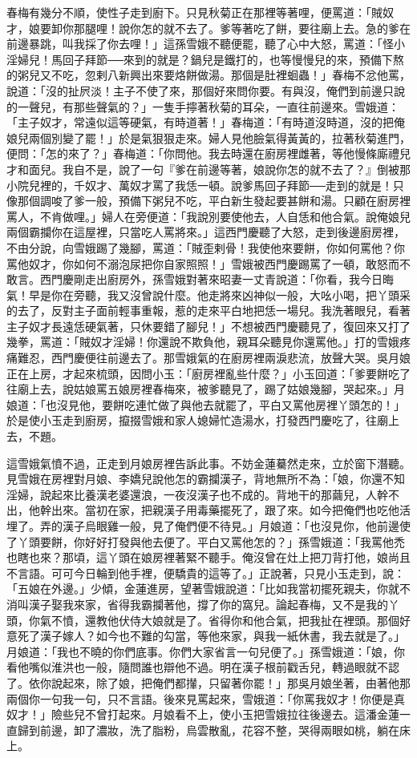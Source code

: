 \begin{showcontents}{}
春梅有幾分不順，使性子走到廚下。只見秋菊正在那裡等著哩，便罵道：「賊奴才，娘要卸你那腿哩！說你怎的就不去了。爹等著吃了餅，要往廟上去。急的爹在前邊暴跳，叫我採了你去哩！」這孫雪娥不聽便罷，聽了心中大怒，罵道：「怪小淫婦兒！馬回子拜節──來到的就是？鍋兒是鐵打的，也等慢慢兒的來，預備下熬的粥兒又不吃，忽剌八新興出來要烙餅做湯。那個是肚裡蛔蟲！」春梅不忿他罵，說道：「沒的扯屄淡！主子不使了來，那個好來問你要。有與沒，俺們到前邊只說的一聲兒，有那些聲氣的？」一隻手擰著秋菊的耳朵，一直往前邊來。雪娥道：「主子奴才，常遠似這等硬氣，有時道著！」春梅道：「有時道沒時道，沒的把俺娘兒兩個別變了罷！」於是氣狠狠走來。婦人見他臉氣得黃黃的，拉著秋菊進門，便問：「怎的來了？」春梅道：「你問他。我去時還在廚房裡雌著，等他慢條廝禮兒才和面兒。我自不是，說了一句『爹在前邊等著，娘說你怎的就不去了？』倒被那小院兒裡的，千奴才、萬奴才罵了我恁一頓。說爹馬回子拜節──走到的就是！只像那個調唆了爹一般，預備下粥兒不吃，平白新生發起要甚餅和湯。只顧在廚房裡罵人，不肯做哩。」婦人在旁便道：「我說別要使他去，人自恁和他合氣。說俺娘兒兩個霸攔你在這屋裡，只當吃人罵將來。」這西門慶聽了大怒，走到後邊廚房裡，不由分說，向雪娥踢了幾腳，罵道：「賊歪剌骨！我使他來要餅，你如何罵他？你罵他奴才，你如何不溺泡尿把你自家照照！」雪娥被西門慶踢罵了一頓，敢怒而不敢言。西門慶剛走出廚房外，孫雪娥對著來昭妻一丈青說道：「你看，我今日晦氣！早是你在旁聽，我又沒曾說什麼。他走將來凶神似一般，大吆小喝，把丫頭采的去了，反對主子面前輕事重報，惹的走來平白地把恁一場兒。我洗著眼兒，看著主子奴才長遠恁硬氣著，只休要錯了腳兒！」不想被西門慶聽見了，復回來又打了幾拳，罵道：「賊奴才淫婦！你還說不欺負他，親耳朵聽見你還罵他。」打的雪娥疼痛難忍，西門慶便往前邊去了。那雪娥氣的在廚房裡兩淚悲流，放聲大哭。吳月娘正在上房，才起來梳頭，因問小玉：「廚房裡亂些什麼？」小玉回道：「爹要餅吃了往廟上去，說姑娘罵五娘房裡春梅來，被爹聽見了，踢了姑娘幾腳，哭起來。」月娘道：「也沒見他，要餅吃連忙做了與他去就罷了，平白又罵他房裡丫頭怎的！」於是使小玉走到廚房，攛掇雪娥和家人媳婦忙造湯水，打發西門慶吃了，往廟上去，不題。

這雪娥氣憤不過，正走到月娘房裡告訴此事。不妨金蓮驀然走來，立於窗下潛聽。見雪娥在房裡對月娘、李嬌兒說他怎的霸攔漢子，背地無所不為：「娘，你還不知淫婦，說起來比養漢老婆還浪，一夜沒漢子也不成的。背地干的那繭兒，人幹不出，他幹出來。當初在家，把親漢子用毒藥擺死了，跟了來。如今把俺們也吃他活埋了。弄的漢子烏眼雞一般，見了俺們便不待見。」月娘道：「也沒見你，他前邊使了丫頭要餅，你好好打發與他去便了。平白又罵他怎的？」孫雪娥道：「我罵他禿也瞎也來？那頃，這丫頭在娘房裡著緊不聽手。俺沒曾在灶上把刀背打他，娘尚且不言語。可可今日輪到他手裡，便驕貴的這等了。」正說著，只見小玉走到，說： 「五娘在外邊。」少傾，金蓮進房，望著雪娥說道：「比如我當初擺死親夫，你就不消叫漢子娶我來家，省得我霸攔著他，撐了你的窩兒。論起春梅，又不是我的丫頭，你氣不憤，還教他伏侍大娘就是了。省得你和他合氣，把我扯在裡頭。那個好意死了漢子嫁人？如今也不難的勾當，等他來家，與我一紙休書，我去就是了。」 月娘道：「我也不曉的你們底事。你們大家省言一句兒便了。」孫雪娥道：「娘，你看他嘴似淮洪也一般，隨問誰也辯他不過。明在漢子根前戳舌兒，轉過眼就不認了。依你說起來，除了娘，把俺們都攆，只留著你罷！」那吳月娘坐著，由著他那兩個你一句我一句，只不言語。後來見罵起來，雪娥道：「你罵我奴才！你便是真奴才！」險些兒不曾打起來。月娘看不上，使小玉把雪娥拉往後邊去。這潘金蓮一直歸到前邊，卸了濃妝，洗了脂粉，烏雲散亂，花容不整，哭得兩眼如桃，躺在床上。


\end{showcontents}
